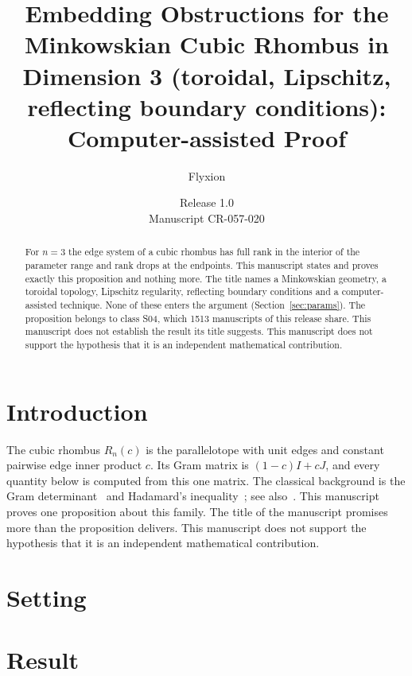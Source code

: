 \documentclass[11pt]{article}
\title{Embedding Obstructions for the Minkowskian Cubic Rhombus in Dimension 3 (toroidal, Lipschitz, reflecting boundary conditions): Computer-assisted Proof}
\author{Flyxion}
\date{Release 1.0\\ Manuscript CR-057-020}
\begin{document}
\maketitle
\begin{abstract}
For $n=3$ the edge system of a cubic rhombus has full rank in the interior of the parameter range and rank drops at the endpoints. This manuscript states and proves exactly this proposition and nothing more. The title names a Minkowskian geometry, a toroidal topology, Lipschitz regularity, reflecting boundary conditions and a computer-assisted technique. None of these enters the argument (Section~\ref{sec:params}). The proposition belongs to class S04, which 1513 manuscripts of this release share. This manuscript does not establish the result its title suggests. This manuscript does not support the hypothesis that it is an independent mathematical contribution.
\end{abstract}

\section{Introduction}
The cubic rhombus $R_n(c)$ is the parallelotope with unit edges and constant pairwise edge inner product $c$. Its Gram matrix is $(1-c)I+cJ$, and every quantity below is computed from this one matrix. The classical background is the Gram determinant~\cite{gram} and Hadamard's inequality~\cite{hadamard}; see also~\cite{hj}.
This manuscript proves one proposition about this family. The title of the manuscript promises more than the proposition delivers. This manuscript does not support the hypothesis that it is an independent mathematical contribution.

\section{Setting}


\section{Result}

\end{document}
